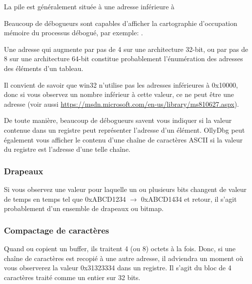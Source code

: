 La pile est généralement située à une adresse inférieure à %

Beaucoup de débogueurs sont capables d'afficher la cartographie d'occupation mémoire du processus
débogué, par exemple: .

Une adresse qui augmente par pas de 4 sur une architecture 32-bit, ou par pas de 8 sur une
architecture 64-bit constitue probablement l'énumération des adresses des éléments d'un tableau.

Il convient de savoir que win32 n'utilise pas les adresses inférieures à 0x10000, donc si vous
observez un nombre inférieur à cette valeur, ce ne peut être une adresse (voir aussi
\url{https://msdn.microsoft.com/en-us/library/ms810627.aspx}).

De toute manière, beaucoup de débogueurs savent vous indiquer si la valeur contenue dans un
registre peut représenter l'adresse d'un élément. OllyDbg peut également vous afficher le
contenu d'une chaîne de caractères ASCII si la valeur du registre est l'adresse d'une telle
chaîne.

\subsubsection{Drapeaux}

Si vous observez une valeur pour laquelle un ou plusieurs bits changent de valeur de temps en
temps tel que 0xABCD1234 $\rightarrow$ 0xABCD1434 et retour, il s'agit probablement d'un ensemble
de drapeaux ou bitmap.

\subsubsection{Compactage de caractères}

Quand  ou  copient un buffer, ils traitent 4 (ou 8) octets à la fois.
Donc, si une chaîne de caractères  est recopié à une autre adresse, il adviendra un
moment où vous observerez la valeur 0x31323334 dans un registre.
Il s'agit du bloc de 4 caractères traité comme un entier sur 32 bits.

